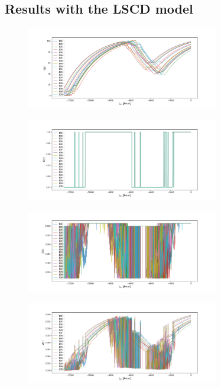 \documentclass[11pt, a4paper]{article}
\begin{document}
\subsection*{Results with the LSCD model}
\begin{figure}[H]
    \centering
    \includegraphics[width=0.75\textwidth]{images/L_plot.png}
\end{figure}
\begin{figure}[H]
    \centering
    \includegraphics[width=0.75\textwidth]{images/S_plot.png}
\end{figure}
\begin{figure}[H]
    \centering
    \includegraphics[width=0.75\textwidth]{images/C_plot.png}
\end{figure}
\begin{figure}[H]
    \centering
    \includegraphics[width=0.75\textwidth]{images/nu_plot.png}
\end{figure}
\end{document}

